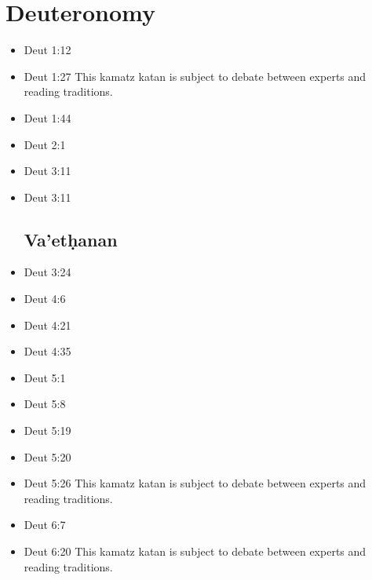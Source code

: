 \documentclass[14pt]{book}
\begin{document}
\section{Deuteronomy}
\begin{multicols}{2}\begin{itemize}
\item Deut 1:12

\item Deut 1:27 This kamatz katan is subject to debate between experts and reading traditions.

\item Deut 1:44

\item Deut 2:1

\item Deut 3:11

\item Deut 3:11

\subsection{Va'et\d{h}anan}

\item Deut 3:24

\item Deut 4:6

\item Deut 4:21

\item Deut 4:35

\item Deut 5:1

\item Deut 5:8

\item Deut 5:19

\item Deut 5:20

\item Deut 5:26 This kamatz katan is subject to debate between experts and reading traditions.

\item Deut 6:7

\item Deut 6:20 This kamatz katan is subject to debate between experts and reading traditions.


\end{itemize}
\end{multicols}
\end{document}
